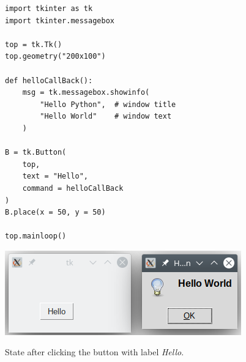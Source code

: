 \begin{frame}[fragile]
%
\begin{tcbraster}[raster columns=2,
                  raster equal height,
                  nobeforeafter,
                  raster column skip=0.5cm]
\begin{codebox}
\begin{verbatim}
import tkinter as tk
import tkinter.messagebox

top = tk.Tk()
top.geometry("200x100")

def helloCallBack():
    msg = tk.messagebox.showinfo(
        "Hello Python",  # window title
        "Hello World"    # window text
    )

B = tk.Button(
    top,
    text = "Hello",
    command = helloCallBack
)
B.place(x = 50, y = 50)

top.mainloop()
\end{verbatim}
\end{codebox}
%
\begin{tcolorbox}[title=Output: Hello World]
\begin{center}
\includegraphics[width=\linewidth]{./gfx/tk-button}
\end{center}
State after clicking the button with label \emph{Hello}.
\end{tcolorbox}
\end{tcbraster}
%
\end{frame}


